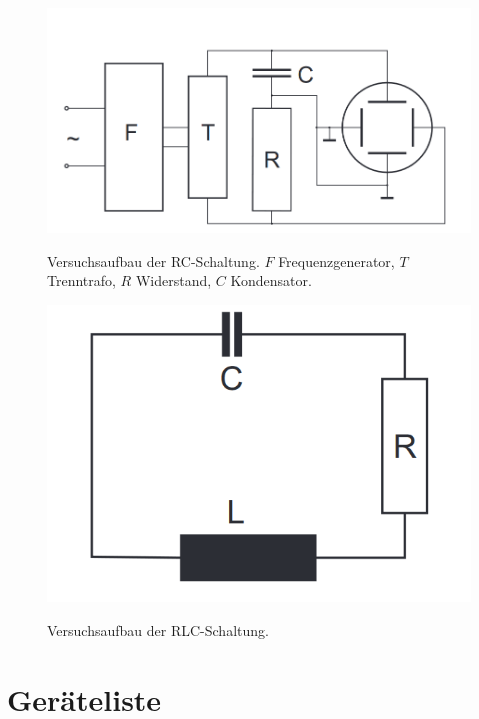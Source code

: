 \documentclass{article}
\begin{document}
\begin{figure}[H]
\caption{Versuchsaufbau der RC-Schaltung. $F$ Frequenzgenerator, $T$ Trenntrafo, $R$ Widerstand, $C$ Kondensator.}
{\centering
\includegraphics[scale=0.4]{basics1.png}}
\end{figure}

\begin{figure}[H]
\caption{Versuchsaufbau der RLC-Schaltung.}
{\centering
\includegraphics[scale=0.4]{basics2.png}}
\end{figure}


\section{Geräteliste}
\end{document}
